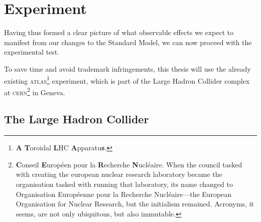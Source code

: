 \chapter{Experiment}\label{ch.exp}

Having thus formed a clear picture of what observable effects we expect to manifest from our changes to the Standard Model, we can now proceed with the experimental test.

To save time and avoid trademark infringements, this thesis will use the already existing \textsc{atlas}\footnote{\textbf{A} \textbf{T}oroidal \textbf{L}HC \textbf{A}pparatu\textbf{s}.} experiment, which is part of the Large Hadron Collider complex at \textsc{cern}\footnote{\textbf{C}onseil \textbf{E}uropéen pour la \textbf{R}echerche \textbf{N}ucléaire. When the council tasked with creating the european nuclear research laboratory became the organisation tasked with running that laboratory, its name changed to Organisation Européenne pour la Recherche Nucléaire---the European Organisation for Nuclear Research, but the initialism remained. Acronyms, it seems, are not only ubiquitous, but also immutable.} in Geneva.

\section{The Large Hadron Collider}

